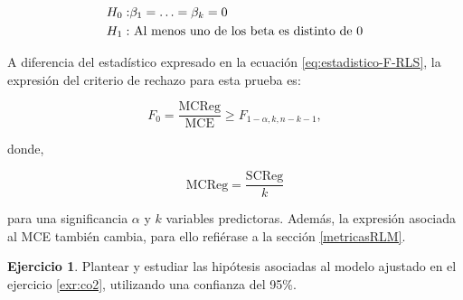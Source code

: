 \documentclass[
  11pt,
]{book}
\theoremstyle{definition}
\theoremstyle{definition}
\theoremstyle{definition}
\newtheorem{exercise}{Ejercicio}[chapter]
\theoremstyle{definition}
\theoremstyle{remark}
\begin{document}
\begin{equation}
\notag
\begin{split}
H_0:& \beta_1 = \ldots  = \beta_k = 0\\
H_1:&\text{ Al menos uno de los beta es distinto de 0}\\
\end{split}
\end{equation}

A diferencia del estadístico expresado en la ecuación \eqref{eq:estadistico-F-RLS}, la expresión del criterio de rechazo para esta prueba es:

\begin{equation}
F_0 = \frac{\text{MCReg}}{\text{MCE}} \geq F_{1-\alpha, k, n-k-1},
\label{eq:estadistico-F-RLM}
\end{equation}

donde,

\begin{equation}
\text{MCReg} = \frac{\text{SCReg}}{k} 
\label{eq:MCReg}
\end{equation}

para una significancia \(\alpha\) y \(k\) variables predictoras. Además, la expresión asociada al MCE también cambia, para ello refiérase a la sección \ref{metricasRLM}.

\begin{exercise}
Plantear y estudiar las hipótesis asociadas al modelo ajustado en el ejercicio \ref{exr:co2}, utilizando una confianza del 95\%.
\end{exercise}
\end{document}
